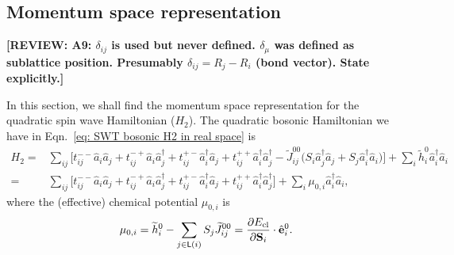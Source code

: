 \documentclass[aps, prx, nofootinbib, superscriptaddress]{revtex4-2}
\newcommand{\REVIEW}[1]{{\color{reviewcolor}\bfseries [REVIEW: #1]}}
\begin{document}
\subsection{Momentum space representation}
\REVIEW{A9: $\delta_{ij}$ is used but never defined. $\delta_\mu$ was defined as sublattice position. Presumably $\delta_{ij} = R_j - R_i$ (bond vector). State explicitly.}

In this section, we shall find the momentum space representation for the quadratic spin wave Hamiltonian ($H_{2}$).
The quadratic bosonic Hamiltonian we have in Eqn.~\eqref{eq: SWT bosonic H2 in real space} is 
\begin{equation}
    \begin{split}
        H_{2} = & \sum_{ij}
        \Big[ t_{ij}^{--} \hat{a}_{i} \hat{a}_{j} + t_{ij}^{-+} \hat{a}_{i}\hat{a}_{j}^{\dagger} + t_{ij}^{+-} \hat{a}_{i}^{\dagger} \hat{a}_{j} + t_{ij}^{++} \hat{a}^{\dagger}_{i} \hat{a}^{\dagger}_{j} - \widetilde{J}_{ij}^{00} \big( S_{i} \hat{a}_{j}^{\dagger} \hat{a}_{j} + S_{j} \hat{a}_{i}^{\dagger} \hat{a}_{i} \big) \Big]  + \sum_{i} \widetilde{h}^{0}_{i} \hat{a}^{\dagger}_{i}\hat{a}_{i} \\
        = & \sum_{ij} 
        \Big[ t_{ij}^{--} \hat{a}_{i} \hat{a}_{j} + t_{ij}^{-+} \hat{a}_{i}\hat{a}_{j}^{\dagger} + t_{ij}^{+-} \hat{a}_{i}^{\dagger} \hat{a}_{j} + t_{ij}^{++} \hat{a}^{\dagger}_{i} \hat{a}^{\dagger}_{j} \Big] 
        + \sum_{i} \mu_{0,i} \hat{a}^{\dagger}_{i} \hat{a}_{i},
    \end{split}
\end{equation}
where the (effective) chemical potential $\mu_{0,i}$ is
\begin{equation}
    \mu_{0,i} = \widetilde{h}^{0}_{i} - \sum_{j \in \mathsf{L}(i)} S_{j} \widetilde{J}^{00}_{ij} = \frac{\partial E_{\rm cl}}{\partial \mathbf{S}_{i}} \cdot \hat{\mathbf{e}}_{i}^{0}.
\end{equation}
\end{document}
